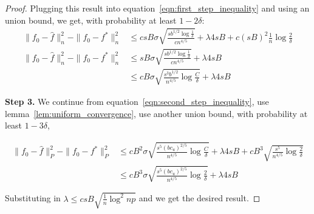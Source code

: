 \begin{proof}




Plugging this result into equation~\ref{eqn:first_step_inequality} and using an union bound, we get, with probability at least $1 - 2\delta$:
\begin{align}
\|f_0 - \hat{f} \|_n^2 - \| f_0 - f^* \|_n^2 
   &\leq c sB \sigma \sqrt{ 
   \frac{s b^{1/2} \log \frac{1}{\delta}}{c n^{4/5}}}
   + \lambda 4 s B + c (sB)^2 \frac{1}{n} \log \frac{2}{\delta} \nonumber\\
\|f_0 - \hat{f} \|_n^2 - \| f_0 - f^* \|_n^2 
   &\leq sB \sigma \sqrt{ 
   \frac{s b^{1/2} \log \frac{1}{\delta}}{c n^{4/5}}}
   + \lambda 4 s B \nonumber\\   
   &\leq cB \sigma 
    \sqrt{ \frac{s^3 b^{1/2}}{n^{4/5}} \log \frac{C}{\delta}} + \lambda 4 sB
\label{eqn:second_step_inequality}
\end{align}


\textbf{Step 3.} We continue from equation~\ref{eqn:second_step_inequality}, use lemma~\ref{lem:uniform_convergence}, use another union bound, with probability at least $1-3\delta$,

\begin{align}
\|f_0 - \hat{f} \|_P^2 - \| f_0 - f^* \|_P^2 
   &\leq cB^2 \sigma 
    \sqrt{ \frac{s^5 (b c_u)^{2/5}}{n^{4/5}} \log \frac{C}{\delta}}
 +\lambda 4 s B + c B^3 \sqrt{ \frac{s^5}{n^{4/5}} \log \frac{2}{\delta}}
    \nonumber \\
&\leq c B^3 \sigma \sqrt{ \frac{s^5(bc_u)^{2/5}}{n^{4/5}} \log \frac{2}{\delta}} + \lambda 4 sB
\end{align}

Substituting in $\lambda \leq c sB \sqrt{\frac{1}{n} \log^2 np}$ and we get the desired result.

\end{proof}
 
